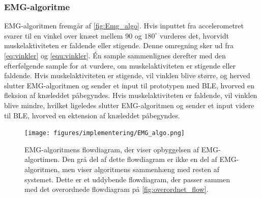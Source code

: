 \subsubsection{EMG-algoritme}
EMG-algoritmen fremgår af \autoref{fig:Emg_algo}. Hvis inputtet fra accelerometret svarer til en vinkel over knæet mellem 90 og $180^{\circ}$ vurderes det, hvorvidt muskelaktiviteten er faldende eller stigende. Denne omregning sker ud fra \autoref{eq:vinkler} og \autoref{equ:vinkler}. Én sample sammenlignes derefter med den efterfølgende sample for at vurdere, om muskelaktiviteten er stigende eller faldende. Hvis muskelaktiviteten er stigende, vil vinklen blive større, og herved slutter EMG-algoritmen og sender et input til prototypen med BLE, hvorved en fleksion af knæleddet påbegyndes. Hvis muskelaktiviteten er faldende, vil vinklen blive mindre, hvilket ligeledes slutter EMG-algoritmen og sender et input videre til BLE, hvorved en ektension af knæleddet påbegyndes. 
\begin{figure}[H]
\centering
\texttt{[image: figures/implementering/EMG\_algo.png]}
\caption{EMG-algoritmens flowdiagram, der viser opbyggelsen af EMG-algortimen. Den grå del af dette flowdiagram er ikke en del af EMG-algoritmen, men viser algoritmens sammenhæng med resten af systemet. Dette er et uddybende flowdiagram, der passer sammen med det overordnede flowdiagram på \autoref{fig:overordnet_flow}.}
\label{fig:Emg_algo}
\end{figure}

